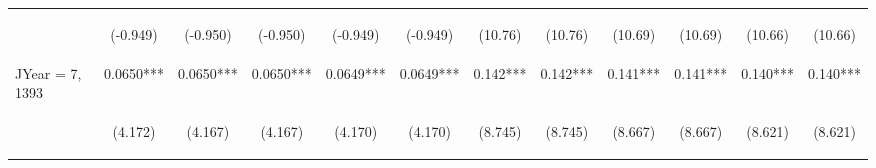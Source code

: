 \documentclass[]{article}
\begin{document}
\begin{center}
\begin{tabular}{lccccccccccc}
\vspace{4pt} & \begin{footnotesize}(-0.949)\end{footnotesize} & \begin{footnotesize}(-0.950)\end{footnotesize} & \begin{footnotesize}(-0.950)\end{footnotesize} & \begin{footnotesize}(-0.949)\end{footnotesize} & \begin{footnotesize}(-0.949)\end{footnotesize} & \begin{footnotesize}(10.76)\end{footnotesize} & \begin{footnotesize}(10.76)\end{footnotesize} & \begin{footnotesize}(10.69)\end{footnotesize} & \begin{footnotesize}(10.69)\end{footnotesize} & \begin{footnotesize}(10.66)\end{footnotesize} & \begin{footnotesize}(10.66)\end{footnotesize} \\
JYear = 7, 1393 & 0.0650*** & 0.0650*** & 0.0650*** & 0.0649*** & 0.0649*** & 0.142*** & 0.142*** & 0.141*** & 0.141*** & 0.140*** & 0.140*** \\
\vspace{4pt} & \begin{footnotesize}(4.172)\end{footnotesize} & \begin{footnotesize}(4.167)\end{footnotesize} & \begin{footnotesize}(4.167)\end{footnotesize} & \begin{footnotesize}(4.170)\end{footnotesize} & \begin{footnotesize}(4.170)\end{footnotesize} & \begin{footnotesize}(8.745)\end{footnotesize} & \begin{footnotesize}(8.745)\end{footnotesize} & \begin{footnotesize}(8.667)\end{footnotesize} & \begin{footnotesize}(8.667)\end{footnotesize} & \begin{footnotesize}(8.621)\end{footnotesize} & \begin{footnotesize}(8.621)\end{footnotesize} \\

\end{tabular}
\end{center}
\end{document}
